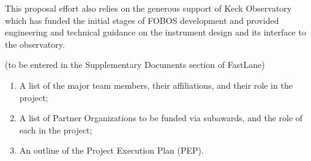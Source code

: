 \documentclass[oneside,11pt]{amsart}
\begin{document}
This proposal effort also relies on the generous support of Keck Observatory which has funded the initial stages of FOBOS development and provided engineering and technical guidance on the instrument design and its interface to the observatory.  



(to be entered in the Supplementary Documents section of FastLane)

\begin{enumerate}
%
\item A list of the major team members, their affiliations, and their
role in the project;
%
\item A list of Partner Organizations to be funded via subawards, and
the role of each in the project;
%
\item An outline of the Project Execution Plan (PEP).
\end{enumerate}


\end{document}
